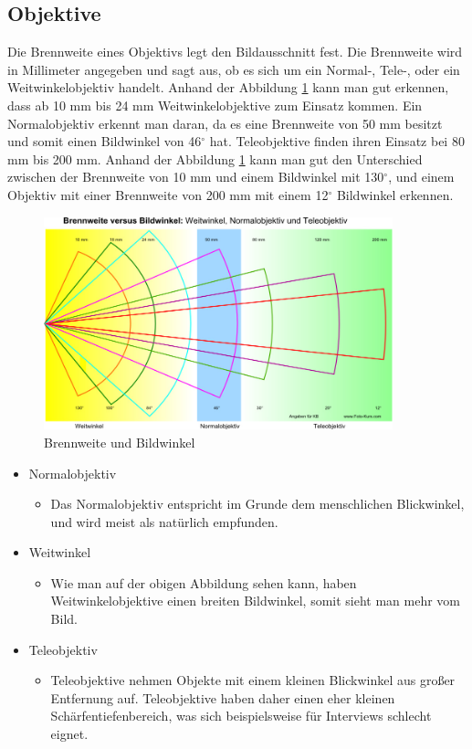 \subsection{Objektive}
Die Brennweite eines Objektivs legt den Bildausschnitt fest. Die Brennweite wird in Millimeter angegeben und sagt aus, ob es sich um ein Normal-, Tele-, oder ein Weitwinkelobjektiv handelt.
Anhand der Abbildung \ref{fig:abb1} kann man gut erkennen, dass ab 10 mm bis 24 mm Weitwinkelobjektive zum Einsatz kommen. Ein Normalobjektiv erkennt man daran, da es eine Brennweite von 50 mm besitzt und somit einen Bildwinkel von 46$^\circ$ hat. Teleobjektive finden ihren Einsatz bei 80 mm bis 200 mm.\citep{objektiv} Anhand der Abbildung \ref{fig:abb1} kann man gut den Unterschied zwischen der Brennweite von 10 mm und einem Bildwinkel mit 130$^\circ$, und einem Objektiv mit einer Brennweite von 200 mm mit einem 12$^\circ$ Bildwinkel erkennen. 
\begin{figure}[H]
	\centering
	\includegraphics[width=0.9\textwidth]{abb1} 
	\caption[Brennweite und Bildwinkel]{Brennweite und Bildwinkel\footnotemark}\label{fig:abb1}
\end{figure}
\begin{itemize}
	\item Normalobjektiv
		\begin{itemize}
		\item Das Normalobjektiv entspricht im Grunde dem menschlichen Blickwinkel, und wird meist als natürlich empfunden.\citep{normalobjektiv}
		\end{itemize}
	\item Weitwinkel
		\begin{itemize}
		\item Wie man auf der obigen Abbildung sehen kann, haben Weitwinkelobjektive einen breiten Bildwinkel, somit sieht man mehr vom Bild.\citep{normalobjektiv}
		\end{itemize}
	\item Teleobjektiv
		\begin{itemize}
		\item Teleobjektive nehmen Objekte mit einem kleinen Blickwinkel aus großer Entfernung auf. Teleobjektive haben daher einen eher kleinen Schärfentiefenbereich, was sich beispielsweise für Interviews schlecht eignet.\citep{tele}
\end{itemize}
\end{itemize}
